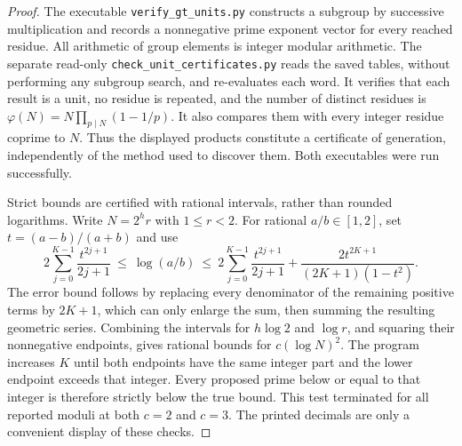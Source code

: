 \documentclass[11pt,a4paper]{article}
\begin{document}
\begin{proof}
The executable \texttt{verify\_gt\_units.py} constructs a subgroup by
successive multiplication and records a nonnegative prime exponent
vector for every reached residue. All arithmetic of group elements is
integer modular arithmetic. The separate read-only
\texttt{check\_unit\_certificates.py} reads the saved tables, without
performing any subgroup search, and re-evaluates each word. It verifies
that each result is a unit, no residue is repeated, and the number
of distinct residues is
$\varphi(N)=N\prod_{p\mid N}(1-1/p)$. It also compares them with
every integer residue coprime to $N$. Thus the displayed products
constitute a certificate of generation, independently of the method
used to discover them. Both executables were run successfully.

Strict bounds are certified with rational intervals, rather than
rounded logarithms. Write $N=2^h r$ with $1\leq r<2$. For rational
$a/b\in[1,2]$, set $t=(a-b)/(a+b)$ and use
\[
 2\sum_{j=0}^{K-1}\frac{t^{2j+1}}{2j+1}
 \ \leq\ \log(a/b)\ \leq\
 2\sum_{j=0}^{K-1}\frac{t^{2j+1}}{2j+1}
       +\frac{2t^{2K+1}}{(2K+1)(1-t^2)}.
 \tag{T05.1}
\]
The error bound follows by replacing every denominator of the
remaining positive terms by $2K+1$, which can only enlarge the sum,
then summing the resulting geometric series. Combining the
intervals for $h\log2$ and $\log r$, and squaring their nonnegative
endpoints, gives rational bounds for $c(\log N)^2$. The program
increases $K$ until both endpoints have the same integer part and
the lower endpoint exceeds that integer. Every proposed prime below
or equal to that integer is therefore strictly below the true bound.
This test terminated for all reported moduli at both $c=2$ and $c=3$.
The printed decimals are only a convenient display of these checks.
\end{proof}
\end{document}
